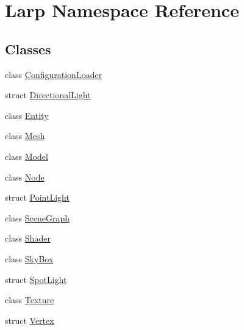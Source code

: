 \hypertarget{namespaceLarp}{}\section{Larp Namespace Reference}
\label{namespaceLarp}
\subsection*{Classes}
\begin{DoxyCompactItemize}
\item 
class \hyperlink{classLarp_1_1ConfigurationLoader}{Configuration\+Loader}
\item 
struct \hyperlink{structLarp_1_1DirectionalLight}{Directional\+Light}
\item 
class \hyperlink{classLarp_1_1Entity}{Entity}
\item 
class \hyperlink{classLarp_1_1Mesh}{Mesh}
\item 
class \hyperlink{classLarp_1_1Model}{Model}
\item 
class \hyperlink{classLarp_1_1Node}{Node}
\item 
struct \hyperlink{structLarp_1_1PointLight}{Point\+Light}
\item 
class \hyperlink{classLarp_1_1SceneGraph}{Scene\+Graph}
\item 
class \hyperlink{classLarp_1_1Shader}{Shader}
\item 
class \hyperlink{classLarp_1_1SkyBox}{Sky\+Box}
\item 
struct \hyperlink{structLarp_1_1SpotLight}{Spot\+Light}
\item 
class \hyperlink{classLarp_1_1Texture}{Texture}
\item 
struct \hyperlink{structLarp_1_1Vertex}{Vertex}
\end{DoxyCompactItemize}

